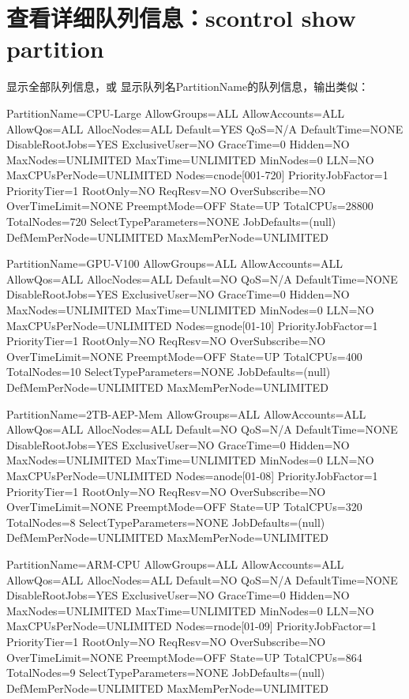 \section{查看详细队列信息：scontrol show partition}
显示全部队列信息，或 显示队列名PartitionName的队列信息，输出类似：
\small
\begin{OUT}
PartitionName=CPU-Large
   AllowGroups=ALL AllowAccounts=ALL AllowQos=ALL
   AllocNodes=ALL Default=YES QoS=N/A
   DefaultTime=NONE DisableRootJobs=YES ExclusiveUser=NO GraceTime=0 Hidden=NO
   MaxNodes=UNLIMITED MaxTime=UNLIMITED MinNodes=0 LLN=NO MaxCPUsPerNode=UNLIMITED
   Nodes=cnode[001-720]
   PriorityJobFactor=1 PriorityTier=1 RootOnly=NO ReqResv=NO OverSubscribe=NO
   OverTimeLimit=NONE PreemptMode=OFF
   State=UP TotalCPUs=28800 TotalNodes=720 SelectTypeParameters=NONE
   JobDefaults=(null)
   DefMemPerNode=UNLIMITED MaxMemPerNode=UNLIMITED

PartitionName=GPU-V100
   AllowGroups=ALL AllowAccounts=ALL AllowQos=ALL
   AllocNodes=ALL Default=NO QoS=N/A
   DefaultTime=NONE DisableRootJobs=YES ExclusiveUser=NO GraceTime=0 Hidden=NO
   MaxNodes=UNLIMITED MaxTime=UNLIMITED MinNodes=0 LLN=NO MaxCPUsPerNode=UNLIMITED
   Nodes=gnode[01-10]
   PriorityJobFactor=1 PriorityTier=1 RootOnly=NO ReqResv=NO OverSubscribe=NO
   OverTimeLimit=NONE PreemptMode=OFF
   State=UP TotalCPUs=400 TotalNodes=10 SelectTypeParameters=NONE
   JobDefaults=(null)
   DefMemPerNode=UNLIMITED MaxMemPerNode=UNLIMITED

PartitionName=2TB-AEP-Mem
   AllowGroups=ALL AllowAccounts=ALL AllowQos=ALL
   AllocNodes=ALL Default=NO QoS=N/A
   DefaultTime=NONE DisableRootJobs=YES ExclusiveUser=NO GraceTime=0 Hidden=NO
   MaxNodes=UNLIMITED MaxTime=UNLIMITED MinNodes=0 LLN=NO MaxCPUsPerNode=UNLIMITED
   Nodes=anode[01-08]
   PriorityJobFactor=1 PriorityTier=1 RootOnly=NO ReqResv=NO OverSubscribe=NO
   OverTimeLimit=NONE PreemptMode=OFF
   State=UP TotalCPUs=320 TotalNodes=8 SelectTypeParameters=NONE
   JobDefaults=(null)
   DefMemPerNode=UNLIMITED MaxMemPerNode=UNLIMITED

PartitionName=ARM-CPU
   AllowGroups=ALL AllowAccounts=ALL AllowQos=ALL
   AllocNodes=ALL Default=NO QoS=N/A
   DefaultTime=NONE DisableRootJobs=YES ExclusiveUser=NO GraceTime=0 Hidden=NO
   MaxNodes=UNLIMITED MaxTime=UNLIMITED MinNodes=0 LLN=NO MaxCPUsPerNode=UNLIMITED
   Nodes=rnode[01-09]
   PriorityJobFactor=1 PriorityTier=1 RootOnly=NO ReqResv=NO OverSubscribe=NO
   OverTimeLimit=NONE PreemptMode=OFF
   State=UP TotalCPUs=864 TotalNodes=9 SelectTypeParameters=NONE
   JobDefaults=(null)
   DefMemPerNode=UNLIMITED MaxMemPerNode=UNLIMITED
\end{OUT}
\normalsize


